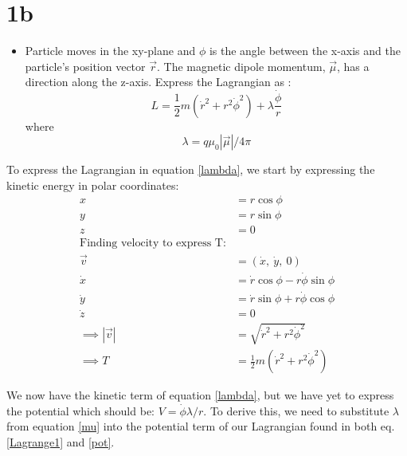 \documentclass{report}
\begin{document}
\section*{1b}
\begin{itemize}
\item Particle moves in the xy-plane and $\phi$ is the angle between the x-axis and the particle's position vector $\vec{r}$. The magnetic dipole momentum, $\vec{\mu}$, has a direction along the z-axis.
Express the Lagrangian as : \begin{equation}
L = \frac{1}{2}m(\dot{r}^2+r^2\dot{\phi}^2) + \lambda\frac{\dot{\phi}}{r}\label{lambda}
\end{equation}
where \begin{equation}\lambda = q\mu_0|\vec{\mu}|/4\pi\label{mu}\end{equation}
\end{itemize}
To express the Lagrangian in equation \ref{lambda}, we start by expressing the kinetic energy in polar coordinates:
\begin{align*}
x &= r\cos{\phi}\\
y&= r\sin{\phi}\\
z&=0\\
\text{Finding velocity to express T:}\\
\vec{v} &= (\dot{x},\ \dot{y},\ 0)\\
\dot{x} &= \dot{r}\cos{\phi} - r\dot{\phi}\sin{\phi}\\
\dot{y} &= \dot{r}\sin{\phi} + r\dot{\phi}\cos{\phi}\\
\dot{z} &=0\\
\implies |\vec{v}| &= \sqrt{\dot{r}^2 + r^2\dot{\phi}^2}\\
\implies T &= \frac{1}{2}m(\dot{r}^2 + r^2\dot{\phi}^2)
\end{align*}

We now have the kinetic term of equation \ref{lambda}, but we have yet to express the potential which should be:
$V =\dot{\phi} \lambda/r$. To derive this, we need to substitute $\lambda$ from equation \ref{mu} into the potential term of our Lagrangian found in both eq. \ref{Lagrange1} and \ref{pot}.
\end{document}
